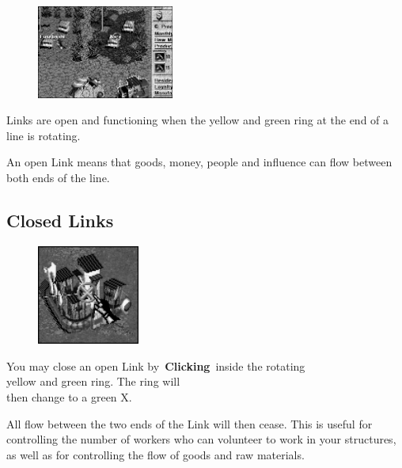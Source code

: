 \begin{figure}
	\vspace{-20pt}
	\begin{center}
		\includegraphics[width=0.4\textwidth]{Iopenlink}
	\end{center}
	\vspace{-20pt}
\end{figure}

Links are open and functioning when the yellow and green ring at the end of a line is rotating.

An open Link means that goods, money, people and influence can flow between both ends of the line.

\subsection{Closed Links}

\begin{figure}
	\vspace{-20pt}
	\begin{center}
		\includegraphics[width=0.3\textwidth]{Icloselink_fort}
	\end{center}
	\vspace{-20pt}
\end{figure}


You may close an open Link by \textbf{Clicking} inside the rotating \\
yellow and green ring. The ring will \\
then change to a green X.

All flow between the two ends of the Link will then cease. This is useful for controlling the number of workers who can volunteer to work in your structures, as well as for controlling the flow of goods and raw materials.

